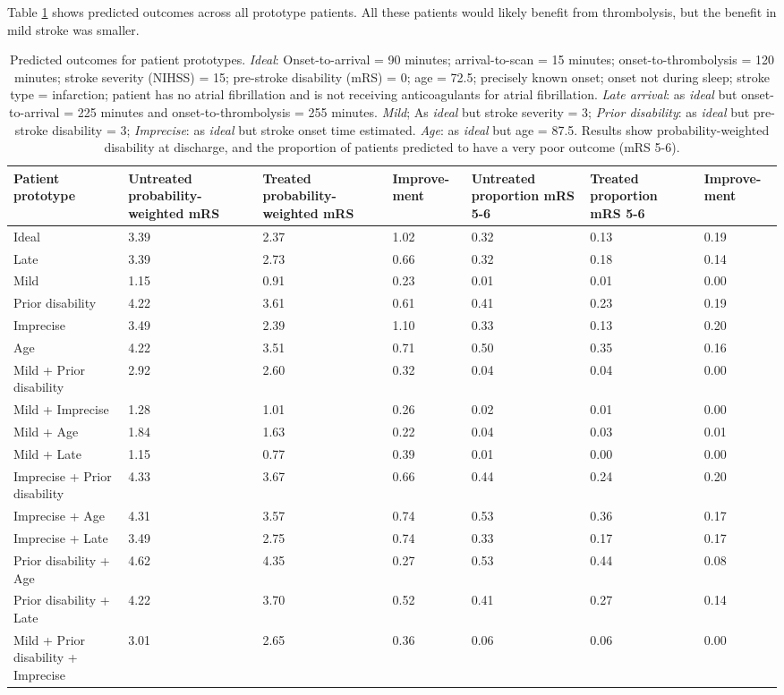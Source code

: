 Table \ref{tab:prototype_outcomes} shows predicted outcomes across all prototype patients. All these patients would likely benefit from thrombolysis, but the benefit in mild stroke was smaller.

\begin{minipage}{1\textwidth}
\small
\begin{longtable}{p{5.2cm} | p{1.6cm} p{1.6cm} p{1.5cm} | p{1.6cm} p{1.6cm} p{1.5cm}}
\caption{Predicted outcomes for patient prototypes. \textit{Ideal}: Onset-to-arrival = 90 minutes; arrival-to-scan = 15 minutes; onset-to-thrombolysis = 120 minutes; stroke severity (NIHSS) = 15; pre-stroke disability (mRS) = 0; age = 72.5; precisely known onset; onset not during sleep; stroke type = infarction; patient has no atrial fibrillation and is not receiving anticoagulants for atrial fibrillation. \textit{Late arrival}: as \textit{ideal} but onset-to-arrival = 225 minutes and onset-to-thrombolysis = 255 minutes. \textit{Mild}; As \textit{ideal} but stroke severity = 3; \textit{Prior disability}: as \textit{ideal} but pre-stroke disability = 3; \textit{Imprecise}: as \textit{ideal} but stroke onset time estimated. \textit{Age}: as \textit{ideal} but age = 87.5. Results show probability-weighted disability at discharge, and the proportion of patients predicted to have a very poor outcome (mRS 5-6).}\\
\label{tab:prototype_outcomes}
Patient prototype & Untreated probability-weighted mRS & Treated probability-weighted mRS & Improve-ment & Untreated proportion mRS 5-6 & Treated proportion mRS 5-6 & Improve-ment\\
\endhead
\midrule
Ideal & 3.39 & 2.37 & 1.02 & 0.32 & 0.13 & 0.19\\
Late & 3.39 & 2.73 & 0.66 & 0.32 & 0.18 & 0.14\\
Mild & 1.15 & 0.91 & 0.23 & 0.01 & 0.01 & 0.00\\
Prior disability & 4.22 & 3.61 & 0.61 & 0.41 & 0.23 & 0.19\\
Imprecise & 3.49 & 2.39 & 1.10 & 0.33 & 0.13 & 0.20\\
Age & 4.22 & 3.51 & 0.71 & 0.50 & 0.35 & 0.16\\
Mild + Prior disability & 2.92 & 2.60 & 0.32 & 0.04 & 0.04 & 0.00\\
Mild + Imprecise & 1.28 & 1.01 & 0.26 & 0.02 & 0.01 & 0.00\\
Mild + Age & 1.84 & 1.63 & 0.22 & 0.04 & 0.03 & 0.01\\
Mild + Late & 1.15 & 0.77 & 0.39 & 0.01 & 0.00 & 0.00\\
Imprecise + Prior disability & 4.33 & 3.67 & 0.66 & 0.44 & 0.24 & 0.20\\
Imprecise + Age & 4.31 & 3.57 & 0.74 & 0.53 & 0.36 & 0.17\\
Imprecise + Late & 3.49 & 2.75 & 0.74 & 0.33 & 0.17 & 0.17\\
Prior disability + Age & 4.62 & 4.35 & 0.27 & 0.53 & 0.44 & 0.08\\
Prior disability + Late & 4.22 & 3.70 & 0.52 & 0.41 & 0.27 & 0.14\\
Mild + Prior disability + Imprecise & 3.01 & 2.65 & 0.36 & 0.06 & 0.06 & 0.00\\



\end{longtable}
\end{minipage}
